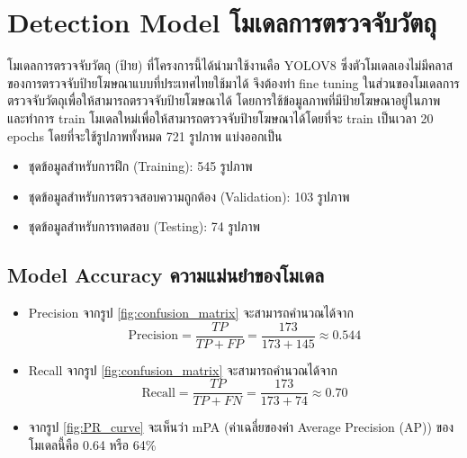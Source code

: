 \clearpage

\section{\ifenglish Detection Model \else โมเดลการตรวจจับวัตถุ \fi}
\ifenglish \else
โมเดลการตรวจจับวัตถุ (ป้าย) ที่โครงการนี้ได้นำมาใช้งานคือ YOLOV8 ซึ่งตัวโมเดลเองไม่มีคลาสของการตรวจจับป้ายโฆษณาแบบที่ประเทศไทยใช้มาได้ จึงต้องทำ fine tuning ในส่วนของโมเดลการตรวจจับวัตถุเพื่อให้สามารถตรวจจับป้ายโฆษณาได้ โดยการใช้ข้อมูลภาพที่มีป้ายโฆษณาอยู่ในภาพ และทำการ train โมเดลใหม่เพื่อให้สามารถตรวจจับป้ายโฆษณาได้โดยที่จะ train เป็นเวลา 20 epochs โดยที่จะใช้รูปภาพทั้งหมด 721 รูปภาพ แบ่งออกเป็น
\begin{itemize}
    \item ชุดข้อมูลสำหรับการฝึก (Training): 545 รูปภาพ
    \item ชุดข้อมูลสำหรับการตรวจสอบความถูกต้อง (Validation): 103 รูปภาพ
    \item ชุดข้อมูลสำหรับการทดสอบ (Testing): 74 รูปภาพ
\end{itemize}
\fi

\subsection{\ifenglish Model Accuracy \else ความแม่นยำของโมเดล \fi}
\ifenglish \else
\begin{itemize}
    \item Precision จากรูป \ref{fig:confusion_matrix} จะสามารถคำนวณได้จาก \\
        \[
            \text{Precision} = \frac{TP}{TP + FP} = \frac{173}{173 + 145} \approx 0.544
        \]
    \item Recall จากรูป \ref{fig:confusion_matrix} จะสามารถคำนวณได้จาก \\
        \[
            \text{Recall} = \frac{TP}{TP + FN} = \frac{173}{173 + 74} \approx 0.70
        \]
    \item จากรูป \ref{fig:PR_curve} จะเห็นว่า mPA (ค่าเฉลี่ยของค่า Average Precision (AP)) ของโมเดลนี้คือ 0.64 หรือ 64\%
\end{itemize}
\fi

